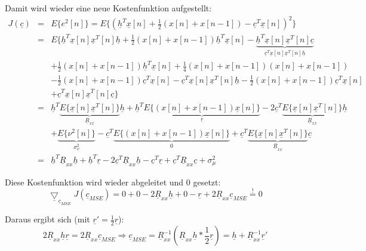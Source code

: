 Damit wird wieder eine neue Kostenfunktion aufgestellt:
\begin{eqnarray}
 J(\underline{c}) & = & E\{e^2[n]\} = E\{(\underline{h}^T \underline{x}[n] + \frac{1}{2} (x[n] + x[n-1]) - \underline{c}^T \underline{x}[n])^2\} \\
 & = & E\{\underline{h}^T \underline{x}[n] \underline{x}^T[n] \underline{h} + \frac{1}{2} (x[n] + x[n-1]) \underline{h}^T \underline{x}[n] - \underbrace{\underline{h}^T \underline{x}[n] \underline{x}^T[n] \underline{c}}_{\underline{c}^T \underline{x}[n] \underline{x}^T[n] \underline{h}} \\
 & & + \frac{1}{2} (x[n] + x[n-1]) \underline{h}^T \underline{x}[n] + \frac{1}{4} (x[n] + x[n-1])(x[n] + x[n-1]) \\
 & & - \frac{1}{2} (x[n] + x[n-1]) \underline{c}^T \underline{x}[n] - \underline{c}^T \underline{x}[n] \underline{x}^T[n] \underline{h} - \frac{1}{2} (x[n] + x[n-1]) \underline{c}^T \underline{x}[n] \\
 & & + \underline{c}^T \underline{x}[n] \underline{x}^T[n] \underline{c}\} \\
 & = & \underline{h}^T \underbrace{E\{\underline{x}[n] \underline{x}^T[n]\}}_{\underline{R}_{xx}} \underline{h} + \underline{h}^T \underbrace{E\{(x[n] + x[n-1]) \underline{x}[n]\}}_{\underline{r}} - 2 \underline{c}^T \underbrace{E\{\underline{x}[n] \underline{x}^T[n]\}}_{\underline{R}_{xx}} \underline{h} \\
 & & + \underbrace{E\{\nu^2[n]\}}_{\sigma_\nu^2} - \underline{c}^T \underbrace{E\{(x[n] + x[n-1]) \underline{x}[n]\}}_{0} + \underline{c}^T \underbrace{E\{\underline{x}[n] \underline{x}^T[n]\}}_{\underline{R}_{xx}} \underline{c} \\
 & = & \underline{h}^T \underline{R}_{xx} \underline{h} + \underline{h}^T \underline{r} - 2 \underline{c}^T \underline{R}_{xx} \underline{h} - \underline{c}^T \underline{r} + \underline{c}^T \underline{R}_{xx} \underline{c} + \sigma_\mu^2
\end{eqnarray}

Diese Kostenfunktion wird wieder abgeleitet und 0 gesetzt:
\begin{equation}
 \underline{\bigtriangledown}_{\underline{c}_{MSE}} J(\underline{c}_{MSE}) = 0 + 0 - 2 \underline{R}_{xx} \underline{h} + 0 - \underline{r} + 2 \underline{R}_{xx} \underline{c}_{MSE} \stackrel{!}{=} 0
\end{equation}

Daraus ergibt sich (mit $\underline{r}' = \frac{1}{2} \underline{r}$):
\begin{equation}
 2 \underline{R}_{xx} \underline{h} \underline{r} = 2 \underline{R}_{xx} \underline{c}_{MSE} \Rightarrow \underline{c}_{MSE} = \underline{R}_{xx}^{-1} ( \underline{R}_{xx} \underline{h} * \frac{1}{2} \underline{r}) = \underline{h} + \underline{R}_{xx}^{-1} \underline{r}'
\end{equation}

